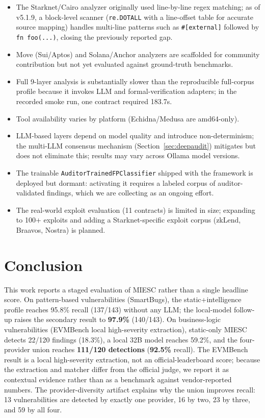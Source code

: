 \documentclass[conference]{IEEEtran}
\begin{document}
\begin{itemize}
    \item The Starknet/Cairo analyzer originally used line-by-line regex matching; as of v5.1.9, a block-level scanner (\texttt{re.DOTALL} with a line-offset table for accurate source mapping) handles multi-line patterns such as \texttt{\#[external]} followed by \texttt{fn foo(...)}, closing the previously reported gap.
    \item Move (Sui/Aptos) and Solana/Anchor analyzers are scaffolded for community contribution but not yet evaluated against ground-truth benchmarks.
    \item Full 9-layer analysis is substantially slower than the reproducible full-corpus profile because it invokes LLM and formal-verification adapters; in the recorded smoke run, one contract required 183.7s.
    \item Tool availability varies by platform (Echidna/Medusa are amd64-only).
    \item LLM-based layers depend on model quality and introduce non-determinism; the multi-LLM consensus mechanism (Section~\ref{sec:deepaudit}) mitigates but does not eliminate this; results may vary across Ollama model versions.
    \item The trainable \texttt{AuditorTrainedFPClassifier} shipped with the framework is deployed but dormant: activating it requires a labeled corpus of auditor-validated findings, which we are collecting as an ongoing effort.
    \item The real-world exploit evaluation (11 contracts) is limited in size; expanding to 100+ exploits and adding a Starknet-specific exploit corpus (zkLend, Braavos, Nostra) is planned.
\end{itemize}

\section{Conclusion}

This work reports a staged evaluation of MIESC rather than a single headline score. On pattern-based vulnerabilities (SmartBugs), the static+intelligence profile reaches 95.8\% recall (137/143) without any LLM; the local-model follow-up raises the secondary result to \textbf{97.9\%} (140/143). On business-logic vulnerabilities (EVMBench local high-severity extraction), static-only MIESC detects 22/120 findings (18.3\%), a local 32B model reaches 59.2\%, and the four-provider union reaches \textbf{111/120 detections} (\textbf{92.5\%} recall). The EVMBench result is a local high-severity extraction, not an official-leaderboard score; because the extraction and matcher differ from the official judge, we report it as contextual evidence rather than as a benchmark against vendor-reported numbers. The provider-diversity artifact explains why the union improves recall: 13 vulnerabilities are detected by exactly one provider, 16 by two, 23 by three, and 59 by all four.
\end{document}
